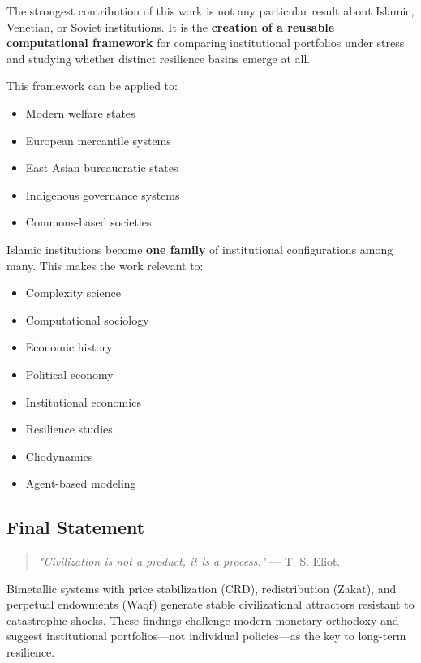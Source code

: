 \documentclass[12pt,a4paper]{article}
\begin{document}
The strongest contribution of this work is not any particular result about Islamic, Venetian, or Soviet institutions. It is the \textbf{creation of a reusable computational framework} for comparing institutional portfolios under stress and studying whether distinct resilience basins emerge at all.

This framework can be applied to:
\begin{itemize}
    \item Modern welfare states
    \item European mercantile systems
    \item East Asian bureaucratic states
    \item Indigenous governance systems
    \item Commons-based societies
\end{itemize}

Islamic institutions become \textbf{one family} of institutional configurations among many. This makes the work relevant to:
\begin{itemize}
    \item Complexity science
    \item Computational sociology
    \item Economic history
    \item Political economy
    \item Institutional economics
    \item Resilience studies
    \item Cliodynamics
    \item Agent-based modeling
\end{itemize}

\subsection{Final Statement}

\begin{quote}
\textit{"Civilization is not a product, it is a process."} --- T. S. Eliot.
\end{quote}

Bimetallic systems with price stabilization (CRD), redistribution (Zakat), and perpetual endowments (Waqf) generate stable civilizational attractors resistant to catastrophic shocks. These findings challenge modern monetary orthodoxy and suggest institutional portfolios---not individual policies---as the key to long-term resilience.

\end{document}
